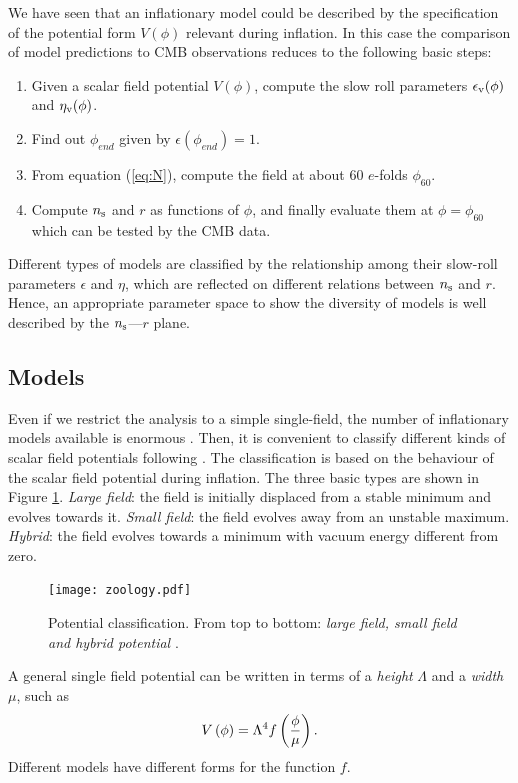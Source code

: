 \documentclass{rmaa}
\begin{document}
We have seen that an inflationary model could be described by the specification of the 
potential form $V(\phi)$ relevant during inflation. In this case the comparison of  
model predictions to CMB observations reduces to the following basic steps:
\begin{enumerate}
 \item Given a scalar field potential $V(\phi)$, compute the slow roll parameters $\epsilon_{\rm v}(\phi)$ and
$\eta_{\rm v}(\phi)$. 
\item Find out $\phi_{end}$ given by $\epsilon(\phi_{end})=1$. 
\item From equation (\ref{eq:N}), compute the field at about 60 $e$-folds $\phi_{60}$.
\item  Compute $n_{\rm s}$ and $r$ as functions of $\phi$, and finally evaluate them at $\phi =
\phi_{60}$ which can be tested by the CMB data. 
\end{enumerate}


Different types of models are classified by the relationship among their slow-roll 
parameters $\epsilon$ and $\eta$, which are reflected on different relations
 between $n_{\rm s}$ and $r$. Hence, an appropriate parameter space to show the diversity of models 
 is well described by the $n_{\rm s}$---$r$ plane.  



\subsection{Models}


Even if we restrict the analysis to a simple single-field, the number of inflationary models
available is enormous \citep{LiddleLyth, Lyth, Linde05}. Then, it is convenient to classify
different kinds of scalar field potentials following \citet{Kinney2}. 
%
The classification is based on the behaviour of the scalar field potential during inflation.
The three basic types are shown in Figure \ref{fig:models}.
{\em Large field}: the field is initially displaced from a stable minimum and evolves 
towards it. {\em Small field}: the field evolves away from an unstable maximum. 
{\em Hybrid}: the field evolves towards a minimum with vacuum energy different from zero. 


\begin{figure}[t!] 
  \texttt{[image: zoology.pdf]}
\caption{Potential classification. From top to bottom:
\textit{large field, small field and hybrid potential} \citep{Kinney2}.}
\label{fig:models}
\end{figure}
%
A general single field potential can be written in terms of a \textit{height} $\Lambda$ and a 
\textit{width} $\mu$, such as
%
\begin{equation}
V\left(\phi\right) = \Lambda^4 f\left({\phi \over \mu}\right).
\end{equation}
%
Different models have different forms for the function $f$.
\end{document}
